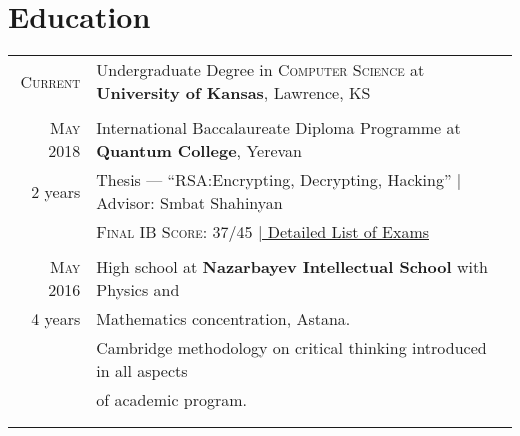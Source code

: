 \documentclass[a4paper,10pt]{article}
\begin{document}
\section{Education}
\begin{tabular}{rl}

  \textsc{Current} & Undergraduate Degree in \textsc{Computer Science} at \normalsize\textbf{University of Kansas}, Lawrence, KS\\
  \\
  
  \textsc{May} 2018& International Baccalaureate Diploma Programme at \textbf{Quantum College}, Yerevan\\
  2 years&Thesis --- ``RSA:\@ Encrypting, Decrypting, Hacking'' | Advisor: Smbat Shahinyan\\
&\textsc{Final IB Score}: 37/45 \hyperlink{ib_grades}{\hfill| \footnotesize Detailed List of Exams}\\&\\

  \textsc{May} 2016& High school at \textbf{Nazarbayev Intellectual School} with Physics and \\4 years&Mathematics concentration, Astana.\\&
  Cambridge methodology on critical thinking introduced in all aspects \\&of academic program.\\\\

\\
  
\end{tabular}


\end{document}
